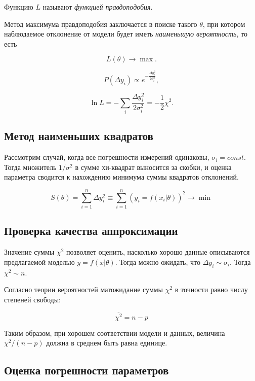 \documentclass[12pt]{article}
\begin{document}
      Функцию $L$ называют \textit{функцией правдоподобия}.

      Метод максимума правдоподобия заключается в поиске такого $\theta$, при котором
      наблюдаемое отклонение от модели будет иметь \textit{наименьшую вероятность}, то есть

      $$
        L(\theta) \rightarrow \max.
      $$

      $$
        P(\Delta y_i) \propto e^{-\frac{\Delta y_i^2}{2 \sigma_i^2}},
      $$

      $$
        \ln{L} = -\sum_i \frac{\Delta y_i^2}{2 \sigma_i^2} = -\frac{1}{2} \chi^2.
      $$

    \subsection{Метод наименьших квадратов}

      Рассмотрим случай, когда все погрешности измерений одинаковы, $\sigma_i = const$.
      Тогда множитель $1/\sigma^2$ в сумме хи-квадрат выносится за скобки, и оценка
      параметра сводится к нахождению минимума суммы квадратов отклонений.

      \begin{equation}
        S(\theta) = \sum_{i=1}^n \Delta y_i^2 \equiv \sum_{i=1}^n
        (y_i = f(x_i | \theta))^2 \rightarrow \min
      \end{equation}

    \subsection{Проверка качества аппроксимации}

      Значение суммы $\chi^2$ позволяет оценить, насколько хорошо данные описываются
      предлагаемой моделью $y = f(x | \theta)$. Тогда можно ожидать, что
      $\Delta y_i \sim \sigma_i$. Тогда $\chi^2 \sim n$.

      Согласно теории вероятностей матожидание суммы $\chi^2$ в точности равно числу
      степеней свободы:

      $$
        \overline{\chi^2} = n - p
      $$

      Таким образом, при хорошем соответствии модели и данных, величина $\chi^2 / (n - p)$
      должна в среднем быть равна единице.

    \subsection{Оценка погрешности параметров}
\end{document}
